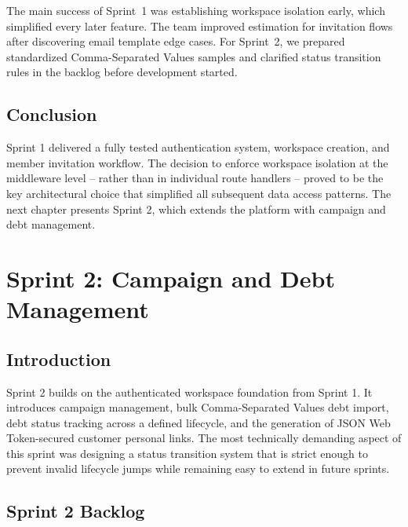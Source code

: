 \documentclass[12pt,a4paper]{report}
\begin{document}
The main success of Sprint~1 was establishing workspace isolation early, which simplified every
later feature.
The team improved estimation for invitation flows after discovering email template edge cases.
For Sprint~2, we prepared standardized Comma-Separated Values samples and clarified status
transition rules in the backlog before development started.

\section*{Conclusion}
{}

Sprint 1 delivered a fully tested authentication system, workspace creation, and
member invitation workflow.
The decision to enforce workspace isolation at the middleware level -- rather than
in individual route handlers -- proved to be the key architectural choice that
simplified all subsequent data access patterns.
The next chapter presents Sprint 2, which extends the platform with campaign and
debt management.

\clearpage
\chapter{Sprint 2: Campaign and Debt Management}
\label{chap:sprint2}

\section*{Introduction}
{}

Sprint 2 builds on the authenticated workspace foundation from Sprint 1.
It introduces campaign management, bulk Comma-Separated Values debt import, debt status tracking across
a defined lifecycle, and the generation of JSON Web Token-secured customer personal links.
The most technically demanding aspect of this sprint was designing a status
transition system that is strict enough to prevent invalid lifecycle jumps while
remaining easy to extend in future sprints.

\section{Sprint 2 Backlog}
\end{document}
